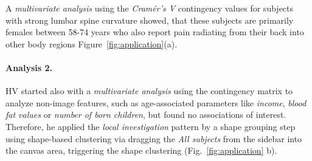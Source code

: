 \documentclass[journal]{style/vgtc} 			          %
\newcommand{\com}[1]{\textcolor{orange}{\uline{#1}}}
\begin{document}
A \emph{multivariate analysis} using the \emph{Cram\'{e}r's V} contingency values for subjects with strong lumbar spine curvature showed, that these subjects are primarily females between 58-74 years who also report pain radiating from their back into other body regions Figure~\ref{fig:application}(a).
%
%
\paragraph{Analysis 2.}
%
HV started also with a \emph{multivariate analysis} using the contingency matrix to analyze non-image features, such as age-associated parameters like \emph{income}, \emph{blood fat values} or \emph{number of born children}, but found no associations of interest.
%
Therefore, he applied the \emph{local investigation} pattern by a shape grouping step using shape-based clustering via dragging the \emph{All subjects} from the sidebar into the canvas area, triggering the shape clustering (Fig.~\ref{fig:application} b).
%
\end{document}
